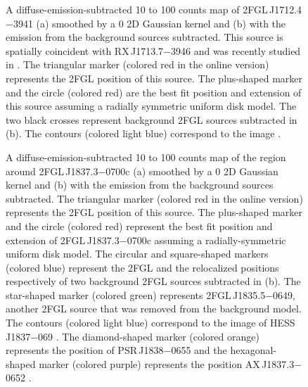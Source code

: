 \documentclass[12pt,preprint]{aastex}
\newif\ifcolorfigure
\newcommand{\gev}{\text{GeV}\xspace}
\newcommand{\tev}{\text{TeV}\xspace}
\begin{document}
\begin{figure}
    \ifcolorfigure
      \plotone{source_plots/source_RX_J1713.7-3946_color.eps}
    \else
    \fi
  \caption{
  A diffuse-emission-subtracted 10 \gev to 100 \gev counts map
  of 2FGL\,J1712.4$-$3941 (a) smoothed by a 0 2D
  Gaussian kernel and (b) with the emission from the background sources
  subtracted.  This source is spatially coincident with RX\,J1713.7$-$3946
  and was recently studied in \cite{rx_j1713_lat}.  The triangular marker
  (colored red in the online version) represents the 2FGL position of
  this source.  The plus-shaped marker and the circle (colored red) are
  the best fit position and extension of this source assuming a radially
  symmetric uniform disk model.  
  The two black crosses represent background 2FGL sources subtracted in (b).
  The contours (colored light blue)
  correspond to the \tev image \citep{rx_j1713_hess}.  
  }\label{2FGL_J1712.4-3941}
\end{figure}


\begin{figure}
    \ifcolorfigure
      \plotone{source_plots/source_HESS_J1837-069_color.eps}
    \else
    \fi
  \caption{
  A diffuse-emission-subtracted 10 \gev to 100 \gev counts map of the
  region around 2FGL\,J1837.3$-$0700c (a) smoothed by a 0 2D Gaussian
  kernel and (b) with the emission from the background sources subtracted.
  The triangular marker (colored red in the online version) represents
  the 2FGL
  position of this source. 
  The plus-shaped marker and 
  the circle (colored red) represent the best fit position and extension
  of 2FGL\,J1837.3$-$0700c assuming a radially-symmetric uniform disk model. 
  The circular and square-shaped markers (colored
  blue) represent the 2FGL and the relocalized positions respectively of
  two background 2FGL sources subtracted in (b).  The star-shaped marker
  (colored green) represents 2FGL\,J1835.5$-$0649, another 2FGL source that was removed from the
  background model.  The contours (colored light blue) correspond to
  the \tev image of HESS\,J1837$-$069
  \citep{hess_plane_survey}.
  The diamond-shaped marker (colored orange) represents the position of PSR\,J1838$-$0655
  and the hexagonal-shaped marker (colored purple) represents the position AX\,J1837.3$-$0652
  \citep{pulsations_HESS_J1837-069}.
  }\label{1FGL_J1837.5-0659c}
\end{figure}
\end{document}
